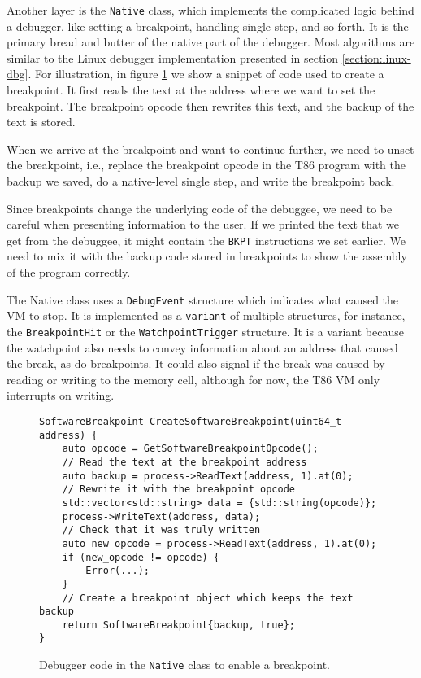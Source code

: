 Another layer is the \texttt{Native} class, which implements the complicated
logic behind a debugger, like setting a breakpoint, handling single-step, and
so forth. It is the primary bread and butter of the native part of the
debugger. Most algorithms are similar to the Linux debugger implementation
presented in section \ref{section:linux-dbg}. For illustration, in figure
\ref{t86dbg:breakpoint} we show a snippet of code used to create a breakpoint.
It first reads the text at the address where we want to set the breakpoint. The
breakpoint opcode then rewrites this text, and the backup of the text is
stored.

When we arrive at the breakpoint and want to continue further, we need to unset
the breakpoint, i.e., replace the breakpoint opcode in the T86 program with the
backup we saved, do a native-level single step, and write the breakpoint back.

Since breakpoints change the underlying code of the debuggee, we need to be
careful when presenting information to the user. If we printed the text that we
get from the debuggee, it might contain the \texttt{BKPT} instructions we set
earlier. We need to mix it with the backup code stored in breakpoints to show
the assembly of the program correctly.

The Native class uses a \texttt{DebugEvent} structure which indicates what
caused the VM to stop. It is implemented as a \texttt{variant} of multiple
structures, for instance, the \texttt{BreakpointHit} or the
\texttt{WatchpointTrigger} structure. It is a variant because the watchpoint
also needs to convey information about an address that caused the break, as do
breakpoints. It could also signal if the break was caused by reading or writing
to the memory cell, although for now, the T86 VM only interrupts on writing.

\begin{figure}
    \begin{verbatim}
SoftwareBreakpoint CreateSoftwareBreakpoint(uint64_t address) {
    auto opcode = GetSoftwareBreakpointOpcode();
    // Read the text at the breakpoint address
    auto backup = process->ReadText(address, 1).at(0);
    // Rewrite it with the breakpoint opcode
    std::vector<std::string> data = {std::string(opcode)};
    process->WriteText(address, data);
    // Check that it was truly written
    auto new_opcode = process->ReadText(address, 1).at(0);
    if (new_opcode != opcode) {
        Error(...);
    }
    // Create a breakpoint object which keeps the text backup
    return SoftwareBreakpoint{backup, true};
}
    \end{verbatim}
    \caption{Debugger code in the \texttt{Native} class to enable a breakpoint.}
    \label{t86dbg:breakpoint}
\end{figure}

